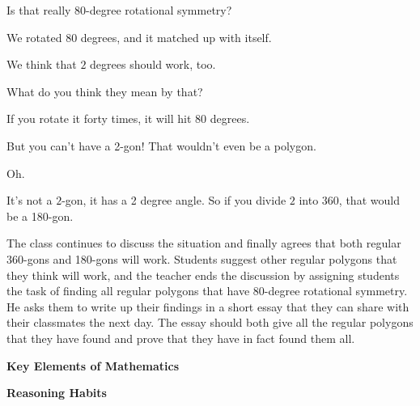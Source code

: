 {\begin{scriptlist}
      \item [Teacher:] Is that really 80-degree rotational symmetry?

      \item [Student 3:] We rotated $80$ degrees, and it matched up with itself.

      \item [Student 4:] We think that $2$ degrees should work, too.

      \item [Teacher:] What do you think they mean by that?

      \item [Student 4:] If you rotate it forty times, it will hit $80$ degrees.

      \item [Student 5:] But you can't have a 2-gon! That wouldn't even be a polygon.

      \item [Student 4:] Oh.

      \item [Student 6:] It's not a $2$-gon, it has a 2 degree angle. So if you divide $2$ into $360$, that would be a 180-gon.
    \end{scriptlist}

    The class continues to discuss the situation and finally agrees that both regular 360-gons and 180-gons will work. Students suggest other regular polygons that they think will work, and the teacher ends the discussion by assigning students the task of finding all regular polygons that have 80-degree rotational symmetry. He asks them to write up their findings in a short essay that they can share with their classmates the next day. The essay should both give all the regular polygons that they have found and prove that they have in fact found them all.

    \textbf{Key Elements of Mathematics}

    \begin{hanglist}
    \end{hanglist}

    \textbf{Reasoning Habits}

    \begin{hanglist}
      \vspace{\baselineskip}


    \end{hanglist}
  }
